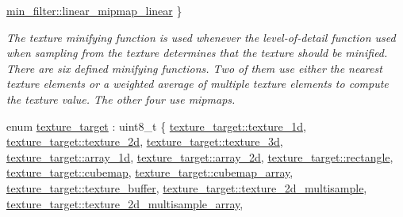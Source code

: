 \begin{DoxyCompactItemize}
\mbox{\hyperlink{namespacemoka_afeea6a53d61ee8561c91c62f5a051a77a1bdd53f0fc057644ac46aa6a083d316f}{min\+\_\+filter\+::linear\+\_\+mipmap\+\_\+linear}}
 \}
\begin{DoxyCompactList}\small\item\em The texture minifying function is used whenever the level-\/of-\/detail function used when sampling from the texture determines that the texture should be minified. There are six defined minifying functions. Two of them use either the nearest texture elements or a weighted average of multiple texture elements to compute the texture value. The other four use mipmaps. \end{DoxyCompactList}\item 
enum \mbox{\hyperlink{namespacemoka_a259bf395c8f07bd8d13515efcb542623}{texture\+\_\+target}} \+: uint8\+\_\+t \{ \newline
\mbox{\hyperlink{namespacemoka_a259bf395c8f07bd8d13515efcb542623a438a533af2d646c9803e5e75c98b19a6}{texture\+\_\+target\+::texture\+\_\+1d}}, 
\mbox{\hyperlink{namespacemoka_a259bf395c8f07bd8d13515efcb542623ade86992194d08494a0a0e208a3660f31}{texture\+\_\+target\+::texture\+\_\+2d}}, 
\mbox{\hyperlink{namespacemoka_a259bf395c8f07bd8d13515efcb542623a26ba8c38820156a8b149b8f6fdf61520}{texture\+\_\+target\+::texture\+\_\+3d}}, 
\mbox{\hyperlink{namespacemoka_a259bf395c8f07bd8d13515efcb542623a5609f52155b2dcd93a3d1695e5dc153e}{texture\+\_\+target\+::array\+\_\+1d}}, 
\newline
\mbox{\hyperlink{namespacemoka_a259bf395c8f07bd8d13515efcb542623a91edcc7de88cd1fc35873ad7df605e09}{texture\+\_\+target\+::array\+\_\+2d}}, 
\mbox{\hyperlink{namespacemoka_a259bf395c8f07bd8d13515efcb542623ad98492c62533926b6961f41406756a4e}{texture\+\_\+target\+::rectangle}}, 
\mbox{\hyperlink{namespacemoka_a259bf395c8f07bd8d13515efcb542623a63469dd37fd256264ad46c84e2ff6986}{texture\+\_\+target\+::cubemap}}, 
\mbox{\hyperlink{namespacemoka_a259bf395c8f07bd8d13515efcb542623ad8e509b14ad61b231f27dd8507ba4c5b}{texture\+\_\+target\+::cubemap\+\_\+array}}, 
\newline
\mbox{\hyperlink{namespacemoka_a259bf395c8f07bd8d13515efcb542623a42f6abd6897bf7bf221ff58362f42cde}{texture\+\_\+target\+::texture\+\_\+buffer}}, 
\mbox{\hyperlink{namespacemoka_a259bf395c8f07bd8d13515efcb542623a97fd573a15c041546b6628f4a44fbc6a}{texture\+\_\+target\+::texture\+\_\+2d\+\_\+multisample}}, 
\mbox{\hyperlink{namespacemoka_a259bf395c8f07bd8d13515efcb542623a50d8c17e415f13b49a170c4b6aa7e97c}{texture\+\_\+target\+::texture\+\_\+2d\+\_\+multisample\+\_\+array}}, 

\end{DoxyCompactItemize}
